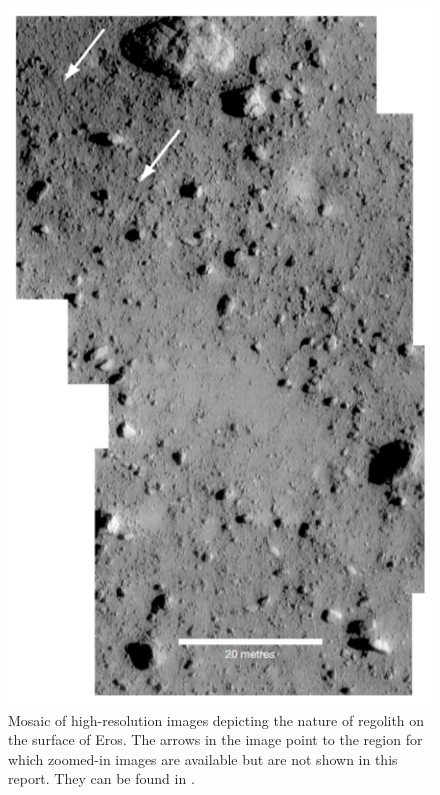 \begin{figure}[htb]
\centering
\captionsetup{justification=centering}
\includegraphics[width=\linewidth, height=0.5\textheight, keepaspectratio=true]{eros_regolith.pdf}
\caption{Mosaic of high-resolution images depicting the nature of regolith on the surface of Eros. The arrows in the image point to the region for which zoomed-in images are available but are not shown in this report. They can be found in \cite{veverka2001landing}.}
\label{fig:eros_regolith}
\end{figure}
\FloatBarrier


